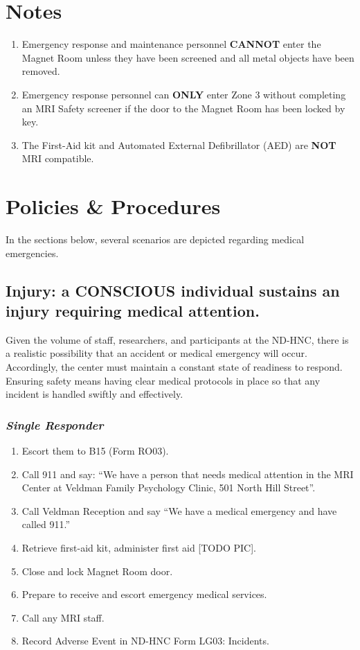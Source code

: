 \documentclass[11pt]{article}
\begin{document}
\section{Notes}

\begin{enumerate}
	\item Emergency response and maintenance personnel \textbf{CANNOT} enter the Magnet Room unless they have been screened and all metal objects have been removed.
	\item Emergency response personnel can \textbf{ONLY} enter Zone 3 without completing an MRI Safety screener if the door to the Magnet Room has been locked by key.
	\item The First-Aid kit and Automated External Defibrillator (AED) are \textbf{NOT} MRI compatible.
\end{enumerate}

\section{Policies \& Procedures}
\label{sec:policies}

In the sections below, several scenarios are depicted regarding medical emergencies.


\subsection{Injury: a \textbf{CONSCIOUS} individual sustains an injury requiring medical attention.}
\label{ssec:injury-cons}

Given the volume of staff, researchers, and participants at the ND-HNC, there is a realistic possibility that an accident or medical emergency will occur. Accordingly, the center must maintain a constant state of readiness to respond. Ensuring safety means having clear medical protocols in place so that any incident is handled swiftly and effectively.

\subsubsection*{\textit{Single Responder}}

\begin{enumerate}
	\item Escort them to B15 (Form RO03).
	\item Call 911 and say: ``We have a person that needs medical attention in the MRI Center at Veldman Family Psychology Clinic, 501 North Hill Street''.
	\item Call Veldman Reception and say ``We have a medical emergency and have called 911.''
	\item Retrieve first-aid kit, administer first aid [TODO PIC].
	\item Close and lock Magnet Room door.
	\item Prepare to receive and escort emergency medical services.
	\item Call any MRI staff.
	\item Record Adverse Event in ND-HNC Form LG03: Incidents.
\end{enumerate}
\end{document}
